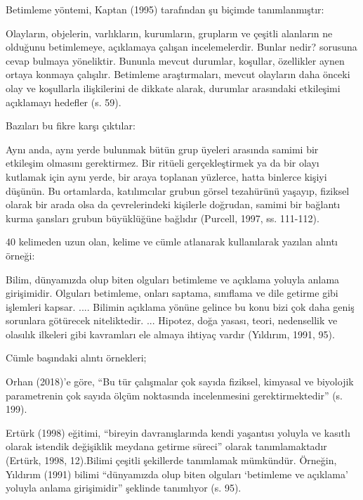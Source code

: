 Betimleme yöntemi, Kaptan (1995) tarafından şu biçimde tanımlanmıştır:

\begin{alinti}
Olayların, objelerin, varlıkların, kurumların, grupların ve çeşitli alanların ne olduğunu betimlemeye, açıklamaya çalışan incelemelerdir. Bunlar nedir? sorusuna cevap bulmaya yöneliktir. Bununla mevcut durumlar, koşullar, özellikler aynen ortaya konmaya çalışılır. Betimleme araştırmaları, mevcut olayların daha önceki olay ve koşullarla ilişkilerini de dikkate alarak, durumlar arasındaki etkileşimi açıklamayı hedefler (s. 59).
\end{alinti}

Bazıları bu fikre karşı çıktılar:

\begin{alinti}
Aynı anda, aynı yerde bulunmak bütün grup üyeleri arasında samimi bir etkileşim olmasını gerektirmez. Bir ritüeli gerçekleştirmek ya da bir olayı kutlamak için aynı yerde, bir araya toplanan yüzlerce, hatta binlerce kişiyi düşünün. Bu ortamlarda, katılımcılar grubun görsel tezahürünü yaşayıp, fiziksel olarak bir arada olsa da çevrelerindeki kişilerle doğrudan, samimi bir bağlantı kurma şansları grubun büyüklüğüne bağlıdır (Purcell, 1997, ss. 111-112).
\end{alinti}

40 kelimeden uzun olan, kelime ve cümle atlanarak kullanılarak yazılan alıntı örneği:

\begin{alinti}
Bilim, dünyamızda olup biten olguları betimleme ve açıklama yoluyla anlama girişimidir. Olguları betimleme, onları saptama, sınıflama ve dile getirme gibi işlemleri kapsar. .... Bilimin açıklama yönüne gelince bu konu bizi çok daha geniş sorunlara götürecek niteliktedir. ... Hipotez, doğa yasası, teori, nedensellik ve olasılık ilkeleri gibi kavramları ele almaya ihtiyaç vardır (Yıldırım, 1991, 95).
\end{alinti}

Cümle başındaki alıntı örnekleri;

Orhan (2018)’e göre, “Bu tür çalışmalar çok sayıda fiziksel, kimyasal ve biyolojik parametrenin çok sayıda ölçüm noktasında incelenmesini gerektirmektedir” (s. 199).

Ertürk (1998) eğitimi, “bireyin davranışlarında kendi yaşantısı yoluyla ve kasıtlı olarak istendik değişiklik meydana getirme süreci” olarak tanımlamaktadır (Ertürk, 1998, 12).Bilimi çeşitli şekillerde tanımlamak mümkündür. Örneğin, Yıldırım (1991) bilimi “dünyamızda olup biten olguları ‘betimleme ve açıklama’ yoluyla anlama girişimidir” şeklinde tanımlıyor (s. 95).


